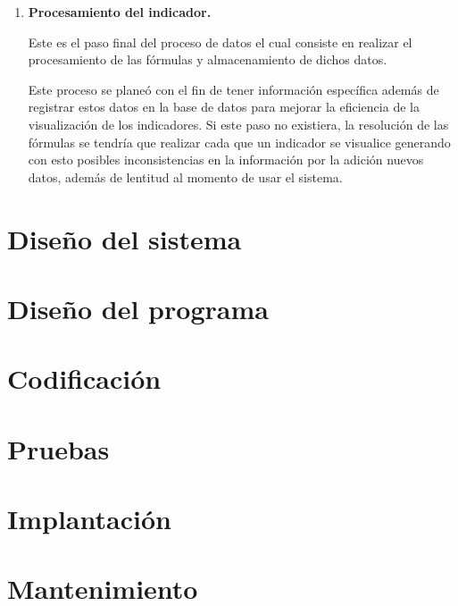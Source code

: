 \begin{enumerate}[1.]
						\textbf{F\'ormulas definidas en el sistema:} Esta funcionalidad permite realizar acciones generales basadas en funciones parametrizables, las cuales se podr\'an acceder con la siguiente nomenclatura NOMBRE\_FUNCION (PARAMETRO\_1, PARAMETRO\_2 ... PARAMETRO\_N).

						Con esto la primera capa de resoluci\'on de f\'ormulas nos permite obtener datos procesados en f\'ormulas que se pueden programar en c\'odigo, ampliando la potencia de la resoluci\'on delas mismas.

						\textbf{F\'ormulas de Microsoft Excel:} Esta funcionalidad es el segundo y \'ultimo de los niveles de resoluci\'on de f\'ormulas del sistema de indicadores, ya que al tener los datos obtenidos mediante la resoluci\'on de f\'ormulas de sistema, podemos realizar la resoluci\'on de f\'ormulas de Excel, permitiendo usar la potencia del motor de f\'ormulas de dicho software, y al tener esta posibilidad se pueden obtener los resultados como si estuvi\'eramos en el mismo software.

					\item \textbf{Procesamiento del indicador.}

						Este es el paso final del proceso de datos el cual consiste en realizar el procesamiento de las f\'ormulas y almacenamiento de dichos datos.

						Este proceso se plane\'o con el fin de tener informaci\'on espec\'ifica adem\'as de registrar estos datos en la base de datos para mejorar la eficiencia de la visualizaci\'on de los indicadores. Si este paso no existiera, la resoluci\'on de las f\'ormulas se tendr\'ia que realizar cada que un indicador se visualice generando con esto posibles inconsistencias en la informaci\'on por la adici\'on  nuevos datos, adem\'as de lentitud al momento de usar el sistema.

		    	\end{enumerate}






		
		
		




	\section{Dise\~no del sistema}
	\section{Dise\~no del programa}
	\section{Codificaci\'on}
	\section{Pruebas}
	\section{Implantaci\'on}
	\section{Mantenimiento}